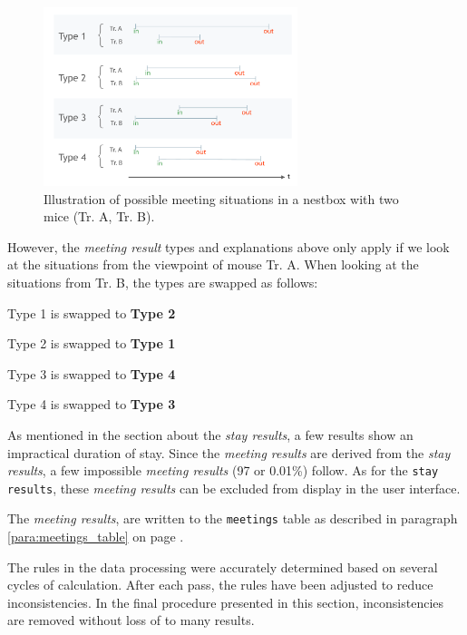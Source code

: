 \begin{figure}[htpb]
\begin{center}
  \includegraphics[width=0.66\textwidth]{assets/pdf/meeting_types_schema.pdf}
  \caption[illustration of meeting result types]{Illustration of possible meeting situations in a nestbox with two mice (Tr. A, Tr. B).}
  \label{fig:meeting_types}
\end{center}
\end{figure}

However, the \textit{meeting result} types and explanations above only apply if we look at the situations from the viewpoint of mouse Tr. A. When looking at the situations from Tr. B, the types are swapped as follows:

\begin{mylist}
\item Type 1 is swapped to \textbf{Type 2}   
\item Type 2 is swapped to \textbf{Type 1}
\item Type 3 is swapped to \textbf{Type 4} 
\item Type 4 is swapped to \textbf{Type 3}
\end{mylist}

As mentioned in the section about the \textit{stay results}, a few results show an impractical duration of stay. Since the \textit{meeting results} are derived from the \textit{stay results}, a few impossible \textit{meeting results} (97 or 0.01\%) follow. As for the \lstinline|stay results|, these \textit{meeting results} can be excluded from display in the user interface.

The \textit{meeting results}, are written to the \lstinline|meetings| table as described in paragraph \ref{para:meetings_table} on page \pageref{para:meetings_table}. 

The rules in the data processing were accurately determined based on several cycles of calculation. After each pass, the rules have been adjusted to reduce inconsistencies. In the final procedure presented in this section, inconsistencies are removed without loss of to many results.

